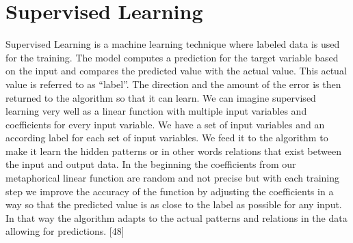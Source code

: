 \documentclass[a4paper,12pt]{report}
\begin{document}
	\section{Supervised Learning}
	Supervised Learning is a machine learning technique where labeled data is used for the training. The model computes a prediction for the target variable based on the input and compares the predicted value with the actual value. This actual value is referred to as “label”. The direction and the amount of the error is then returned to the algorithm so that it can learn. We can imagine supervised learning very well as a linear function with multiple input variables and coefficients for every input variable. We have a set of input variables and an according label for each set of input variables. We feed it to the algorithm to make it learn the hidden patterns or in other words relations that exist between the input and output data. In the beginning the coefficients from our metaphorical linear function are random and not precise but with each training step we improve the accuracy of the function by adjusting the coefficients in a way so that the predicted value is as close to the label as possible for any input. In that way the algorithm adapts to the actual patterns and relations in the data allowing for predictions. [48]
\end{document}
